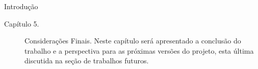\begin{chapter}{Introdução}
\begin{description}
	\item[Capítulo 5.] Considerações Finais. 
    Neste capítulo será apresentado a conclusão do trabalho e a
	perspectiva para as próximas versões do projeto, esta última discutida na
	seção de trabalhos futuros. %
\end{description}

\end{chapter}

